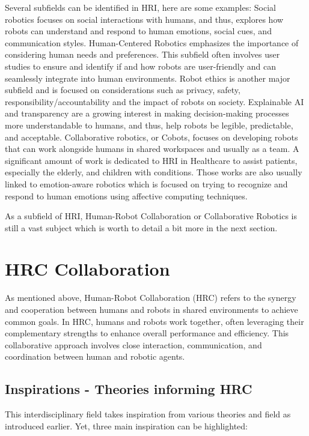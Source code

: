 Several subfields can be identified in HRI, here are some examples:
Social robotics focuses on social interactions with humans, and thus, explores how robots can understand and respond to human emotions, social cues, and communication styles.
Human-Centered Robotics emphasizes the importance of considering human needs and preferences. This subfield often involves user studies to ensure and identify if and how robots are user-friendly and can seamlessly integrate into human environments.
Robot ethics is another major subfield and is focused on considerations such as privacy, safety, responsibility/accountability and the impact of robots on society.
Explainable AI and transparency are a growing interest in making decision-making processes more understandable to humans, and thus, help robots be legible, predictable, and acceptable.
Collaborative robotics, or Cobots, focuses on developing robots that can work alongside humans in shared workspaces and usually as a team.
A significant amount of work is dedicated to HRI in Healthcare to assist patients, especially the elderly, and children with conditions. Those works are also usually linked to emotion-aware robotics which is focused on trying to recognize and respond to human emotions using affective computing techniques.   

As a subfield of HRI, Human-Robot Collaboration or Collaborative Robotics is still a vast subject which is worth to detail a bit more in the next section.

\section{HRC Collaboration}

As mentioned above, Human-Robot Collaboration (HRC) refers to the synergy and cooperation between humans and robots in shared environments to achieve common goals. In HRC, humans and robots work together, often leveraging their complementary strengths to enhance overall performance and efficiency. This collaborative approach involves close interaction, communication, and coordination between human and robotic agents.

\subsection{Inspirations - Theories informing HRC}

This interdisciplinary field takes inspiration from various theories and field as introduced earlier. Yet, three main inspiration can be highlighted:

